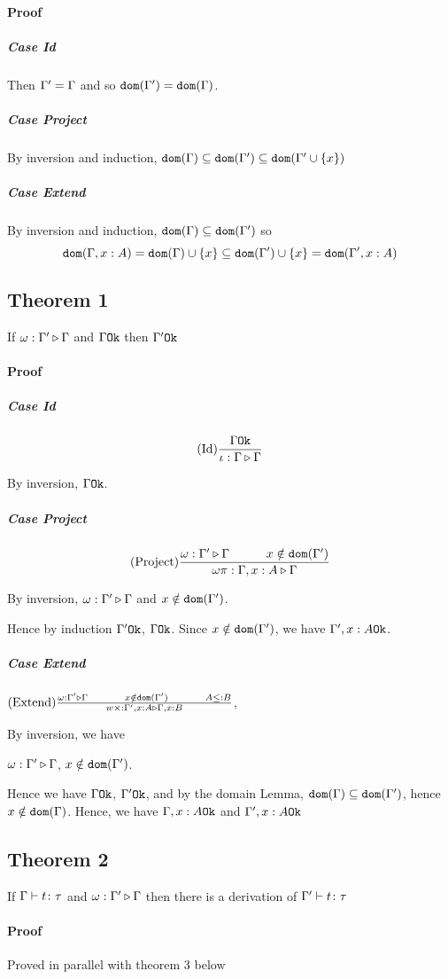 \documentclass{report}
\begin{document}
\paragraph{Proof}
\subparagraph{Case Id}
Then $\Gamma' = \Gamma$ and so $\texttt{dom}(\Gamma') = \texttt{dom}(\Gamma)$.
\subparagraph{Case Project}
By inversion and induction, $\texttt{dom}(\Gamma)\subseteq\texttt{dom}(\Gamma')\subseteq\texttt{dom}(\Gamma'\cup\left\{x\right\})$
\subparagraph{Case Extend}
By inversion and induction, $\texttt{dom}(\Gamma)\subseteq\texttt{dom}(\Gamma')$ so 
$$\texttt{dom}(\Gamma, x: A) = \texttt{dom}(\Gamma)\cup\left\{x\right\} \subseteq\texttt{dom}(\Gamma')\cup\left\{x\right\} = \texttt{dom}(\Gamma',x:A)$$
\subsection{Theorem 1}
If $\omega : \Gamma' \triangleright \Gamma$ and $\Gamma \texttt{Ok}$ then $\Gamma' \texttt{Ok}$
\paragraph{Proof}
\subparagraph{Case Id}
$$(\text{Id}) \frac{\Gamma \texttt{Ok}}{\iota : \Gamma \triangleright \Gamma}$$

By inversion, $\Gamma \texttt{Ok}$.

\subparagraph{Case Project}
$$\treerule{Project}{\wrel{\w}{\G'}{\G}\s\s x \notin \dom{\G'}}{\wrel{\w \pi}{\G, x: A}{\G}}$$

By inversion, $\omega : \Gamma' \triangleright \Gamma$ and $x\notin \texttt{dom}(\Gamma')$.

Hence by induction $\Gamma' \texttt{Ok}$, $\Gamma \texttt{Ok}$. Since $x\notin\texttt{dom}(\Gamma')$, we have $\Gamma', x:A \texttt{Ok}$.

\subparagraph{Case Extend}
$\treerule{Extend}{\wrel{\w}{\G'}{\G}\s\s x \notin \dom{\G'}\s\s A \subtype B}{\wrel{w \x}{\G', x: A}{\G, x: B}}$, 

By inversion, we have 

$\omega : \Gamma' \triangleright \Gamma$, $x\notin\texttt{dom}(\Gamma')$.

Hence we have $\Gamma \texttt{Ok}$, $\Gamma' \texttt{Ok}$, and by the domain Lemma, $\texttt{dom}(\Gamma)\subseteq\texttt{dom}(\Gamma')$, hence $x\notin\texttt{dom}(\Gamma)$. Hence, we have $\Gamma, x: A \texttt{Ok}$ and $\Gamma',x:A \texttt{Ok}$


\subsection{Theorem 2}
If $\Gamma \vdash t \colon \tau$ and $\omega : \Gamma' \triangleright \Gamma$ then there is a derivation of $\Gamma' \vdash t \colon \tau$

\paragraph{Proof}
Proved in parallel with theorem 3 below
\end{document}
